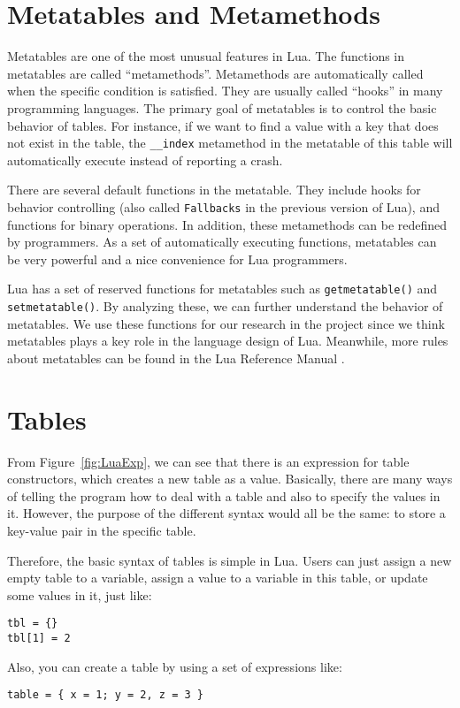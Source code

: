 \section{Metatables and Metamethods}
Metatables are one of the most unusual features in Lua. The functions in metatables are called ``metamethods''. Metamethods are automatically called when the specific condition is satisfied. They are usually called ``hooks'' in many programming languages. The primary goal of metatables is to control the basic behavior of tables. For instance, if we want to find a value with a key that does not exist in the table, the {\tt \_\_index} metamethod in the metatable of this table will automatically execute instead of reporting a crash.

There are several default functions in the metatable. They include hooks for behavior controlling (also called {\tt Fallbacks} in the previous version of Lua), and functions for binary operations. In addition, these metamethods can be redefined by programmers. As a set of automatically executing functions, metatables can be very powerful and a nice convenience for Lua programmers.

Lua has a set of reserved functions for metatables such as {\tt getmetatable()} and {\tt setmetatable()}. By analyzing these, we can further understand the behavior of metatables. We use these functions for our research in the project since we think metatables plays a key role in the language design of Lua. Meanwhile, more rules about metatables can be found in the Lua Reference Manual \cite{LRM}.

\section{Tables}\label{sec: LuaTable}
From Figure~\ref{fig:LuaExp}, we can see that there is an expression for table constructors, which creates a new table as a value. Basically, there are many ways of telling the program how to deal with a table and also to specify the values in it. However, the purpose of the different syntax would all be the same: to store a key-value pair in the specific table.

Therefore, the basic syntax of tables is simple in Lua. Users can just assign a new empty table to a variable, assign a value to a variable in this table, or update some values in it, just like:

\begin{verbatim}
tbl = {}
tbl[1] = 2 
\end{verbatim}
Also, you can create a table by using a set of expressions like:
\begin{verbatim}
table = { x = 1; y = 2, z = 3 } 
\end{verbatim}


